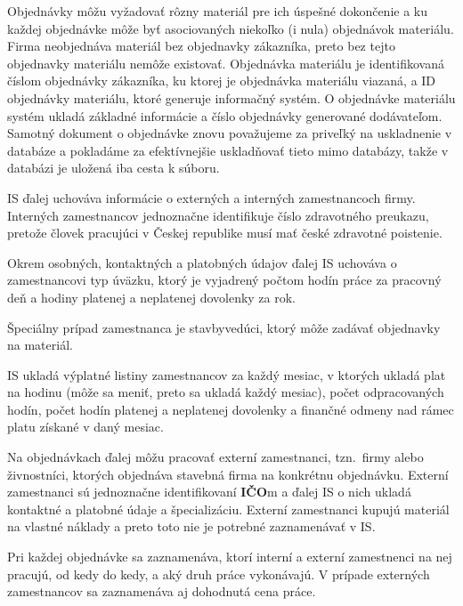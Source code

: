 \documentclass[a4paper]{article}
\begin{document}
Objednávky môžu vyžadovať rôzny materiál pre ich úspešné dokončenie a ku každej objednávke môže byť asociovaných niekoľko (i nula) objednávok materiálu.
Firma neobjednáva materiál bez objednavky zákazníka, preto bez tejto objednavky materiálu nemôže existovať.
Objednávka materiálu je identifikovaná číslom objednávky zákazníka, ku ktorej je objednávka materiálu viazaná, a ID objednávky materiálu, ktoré generuje informačný systém.
O objednávke materiálu systém ukladá základné informácie a číslo objednávky generované dodávateľom.
Samotný dokument o objednávke znovu považujeme za priveľký na uskladnenie v databáze a pokladáme za efektívnejšie uskladňovať tieto mimo databázy, takže v databázi je uložená iba cesta k súboru.

IS ďalej uchováva informácie o externých a interných zamestnancoch firmy.
Interných zamestnancov jednoznačne identifikuje číslo zdravotného preukazu, pretože človek pracujúci v Českej republike musí mať české zdravotné poistenie.

Okrem osobných, kontaktných a platobných údajov ďalej IS uchováva o zamestnancovi typ úväzku, ktorý je vyjadrený počtom hodín práce za pracovný deň a hodiny platenej a neplatenej dovolenky za rok.

Špeciálny prípad zamestnanca je stavbyvedúci, ktorý môže zadávať objednavky na materiál.

IS ukladá výplatné listiny zamestnancov za každý mesiac, v ktorých ukladá plat na hodinu (môže sa meniť, preto sa ukladá každý mesiac), počet odpracovaných hodín, počet hodín platenej a neplatenej dovolenky a finančné odmeny nad rámec platu získané v daný mesiac.

Na objednávkach ďalej môžu pracovať externí zamestnanci, tzn.\ firmy alebo živnostníci, ktorých objednáva stavebná firma na konkrétnu objednávku.
Externí zamestnanci sú jednoznačne identifikovaní \textbf{IČO}m a ďalej IS o nich ukladá kontaktné a platobné údaje a špecializáciu.
Externí zamestnanci kupujú materiál na vlastné náklady a preto toto nie je potrebné zaznamenávať v IS.\@

Pri každej objednávke sa zaznamenáva, ktorí interní a externí zamestnenci na nej pracujú, od kedy do kedy, a aký druh práce vykonávajú.
V prípade externých zamestnancov sa zaznamenáva aj dohodnutá cena práce.
\end{document}
